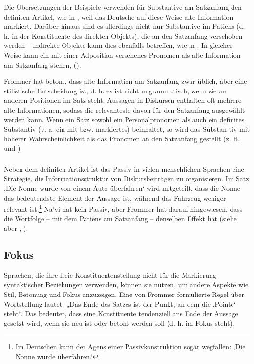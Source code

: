 Die Übersetzungen der Beispiele verwenden für Substantive am Satzanfang den definiten Artikel, wie in  , weil das Deutsche auf diese Weise alte Information markiert. Darüber hinaus sind es allerdings nicht nur Substantive im Patiens (d. h. in der Konstituente des direkten Objekts), die an den Satzanfang verschoben werden -- indirekte Objekte kann dies ebenfalls betreffen, wie in  . In gleicher Weise kann ein mit einer Adposition versehenes Pronomen als alte Information am Satzanfang stehen,   ().

Frommer hat betont, dass alte Information am Satzanfang zwar üblich, aber eine stilistische Entscheidung ist; d. h. es ist nicht ungrammatisch, wenn sie an anderen Positionen im Satz steht. Aussagen in Diskursen enthalten oft mehrere alte Informationen, sodass die relevanteste davon für den Satzanfang ausgewählt werden kann. Wenn ein Satz sowohl ein Personalpronomen als auch ein definites Substantiv (v. a. ein mit  bzw.  markiertes) beinhaltet, so wird das Substan-tiv mit höherer Wahrscheinlichkeit als das Pronomen an den Satzanfang gestellt (z. B.  und ). 

\subsubsection{} Neben dem definiten Artikel ist das Passiv in vielen menschlichen Sprachen eine Strategie, die Informationsstruktur von Diskursbeiträgen zu organisieren. Im Satz ,Die Nonne wurde von einem Auto überfahren‘ wird mitgeteilt, dass die Nonne das bedeutendste Element der Aussage ist, während das Fahrzeug weniger relevant ist.\footnote{Im Deutschen kann der Agens einer Passivkonstruktion sogar wegfallen: ,Die Nonne wurde überfahren.‘} Na'vi hat kein Passiv, aber Frommer hat darauf hingewiesen, dass die Wortfolge  -- mit dem Patiens am Satzanfang -- denselben Effekt hat (siehe aber , ). \label{osv-passive} 

\subsection{Fokus} 
Sprachen, die ihre freie Konstituentenstellung nicht für die Markierung syntaktischer Beziehungen verwenden, können sie nutzen, um andere Aspekte wie Stil, Betonung und Fokus anzuzeigen.
Eine von Frommer formulierte Regel über Wortstellung lautet: „Das Ende des Satzes ist der Punkt, an dem die ,Pointe‘ steht“. Das bedeutet, dass eine Konstituente tendenziell ans Ende der Aussage gesetzt wird, wenn sie neu ist oder betont werden soll (d. h. im Fokus steht).

